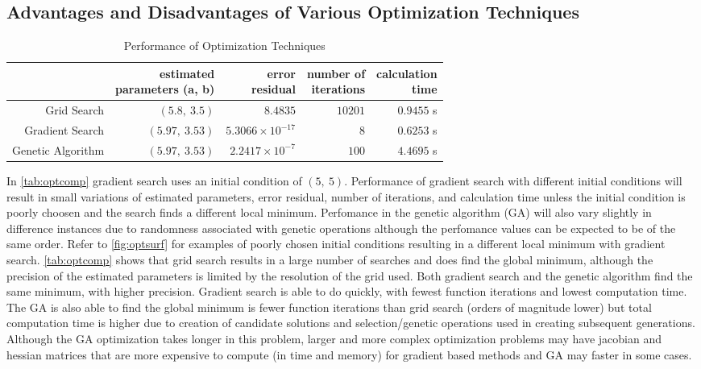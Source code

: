 \documentclass[11pt,a4paper]{article}
\begin{document}
\subsection{Advantages and Disadvantages of Various Optimization Techniques}
\begin{table}
    \centering
    \begin{tabular}{|r|r|r|r|r|}
        \hline
        \nonumber & \shortstack[c]{estimated\\parameters (a, b)} &
            \shortstack[c]{error\\residual} &
            \shortstack[c]{number of\\iterations} &
            \shortstack[c]{calculation\\time} \\
        \hline
        Grid Search & $ (5.8,\: 3.5) $ & $ 8.4835 $ & $ 10201 $ &
            $ 0.9455 $ s \\
        Gradient Search & $ (5.97,\: 3.53) $ & $ 5.3066 \times 10^{-17} $ &
            $ 8 $ & $ 0.6253 $ s \\
        Genetic Algorithm & $ (5.97,\: 3.53) $ & $ 2.2417 \times 10^{-7} $ &
            $ 100 $ & $ 4.4695 $ s \\
        \hline
    \end{tabular}
    \caption{Performance of Optimization Techniques}
    \label{tab:optcomp}
\end{table}
In \autoref{tab:optcomp} gradient search uses an initial condition of $ (5,\:
5) $. Performance of gradient search with different initial conditions will
result in small variations of estimated parameters, error residual, number of
iterations, and calculation time unless the initial condition is poorly choosen
and the search finds a different local minimum. Perfomance in the genetic
algorithm (GA) will also vary slightly in difference instances due to
randomness associated with genetic operations although the perfomance values
can be expected to be of the same order. Refer to \autoref{fig:optsurf} for
examples of poorly chosen initial conditions resulting in a different local
minimum with gradient search. \autoref{tab:optcomp} shows that grid search
results in a large number of searches and does find the global minimum,
although the precision of the estimated parameters is limited by the resolution
of the grid used. Both gradient search and the genetic algorithm find the same
minimum, with higher precision. Gradient search is able to do quickly, with
fewest function iterations and lowest computation time. The GA is also able to
find the global minimum is fewer function iterations than grid search (orders
of magnitude lower) but total computation time is higher due to creation of
candidate solutions and selection/genetic operations used in creating
subsequent generations. Although the GA optimization takes longer in this
problem, larger and more complex optimization problems may have jacobian and
hessian matrices that are more expensive to compute (in time and memory) for
gradient based methods and GA may faster in some cases.
\end{document}
